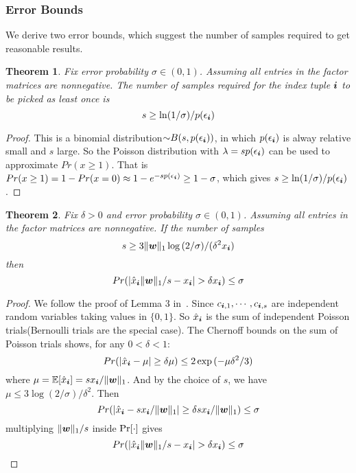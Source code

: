 \documentclass[letterpaper]{article}
\newcommand{\V}[1]{{\boldsymbol{{\MakeLowercase{#1}}}}}
\newcommand{\predx}{\hat{x}_{\V{i}}}
\newcommand{\norm}[2]{\|#1\|_{#2}}
\newtheorem{theorem}{Theorem}
\begin{document}
\subsubsection{Error Bounds}
We derive two error bounds, which suggest the number of samples required to get reasonable results. 
\begin{theorem}\label{theo:ObservationBound}
Fix error probability $\sigma \in (0,1)$.
Assuming all entries in the factor matrices are nonnegative.
The number of samples required for the index tuple $\V{i}$ to be picked as least once is
\[
    s \geq \ln(1/\sigma)/p(\epsilon_{\V{i}})
\]
\end{theorem}
\begin{proof}
This is a binomial distribution${\sim}B(s,p(\epsilon_{\V{i}}))$,
in which $p(\epsilon_{\V{i}})$ is alway relative small and $s$ large.
So the Poisson distribution with $\lambda = sp(\epsilon_{\V{i}})$
can be used to approximate $Pr(x\geq1)$.
That is $Pr(x\geq1) = 1-Pr(x=0)\approx 1-e^{-sp(\epsilon_{\V{i}})} \geq 1-\sigma$,
which gives $s \geq \ln(1/\sigma)/p(\epsilon_{\V{i}})$.
\end{proof}

\begin{theorem}\label{theo:Bound}
Fix $\delta > 0$ and error probability $\sigma \in (0,1)$.
Assuming all entries in the factor matrices are nonnegative.
If the number of samples
\[
    s \geq 3\norm{\V{w}}{1}\log{(2/\sigma)}/(\delta^2 x_{\V{i}})
\]
then
\[
    Pr(|\predx\norm{\V{W}}{1}/s - x_{\V{i}}| > \delta x_{\V{i}}) \leq \sigma
\]
\end{theorem}

\begin{proof}
We follow the proof of Lemma 3 in~\cite{BaPiKoSe15}.
Since  $c_{\V{i},1},\cdots,c_{\V{i},s}$
are independent random variables taking values in $\{0,1\}$.
So $\predx$ is the sum of independent Poisson trials(Bernoulli trials are the special case).
The Chernoff bounds on the sum of Poisson trials shows, for any $0 <\delta <1 $:
\[
    Pr(|\predx - \mu|\geq\delta\mu) \leq 2\exp{(-\mu\delta^2/3)}
\]
where $\mu=\mathbb{E}[\predx]=sx_{\V{i}}/\norm{\V{W}}{1}$.
And by the choice of $s$, we have
$\mu\leq 3\log{(2/\sigma)/\delta^2}$.
Then
\[
    Pr(|\predx-sx_{\V{i}}/\norm{\V{W}}{1}|\geq\delta sx_{\V{i}}/\norm{\V{W}}{1}) \leq \sigma
\]
multiplying $\norm{\V{W}}{1}/s$ inside ${\rm Pr}[\cdot]$ gives
\[
    Pr(|\predx\norm{\V{W}}{1}/s - x_{\V{i}}| > \delta x_{\V{i}}) \leq \sigma
\]
\end{proof}
\end{document}
